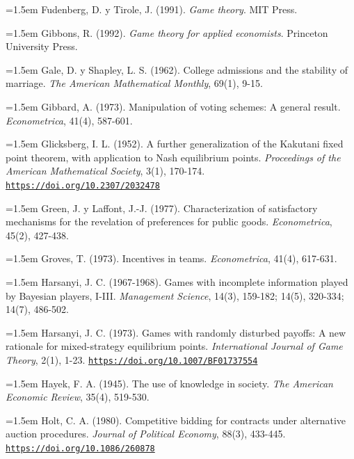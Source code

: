 \documentclass[10pt,a4paper]{article}
\begin{document}
\noindent\hangindent=1.5em Fudenberg, D. y Tirole, J. (1991). \textit{Game theory}. MIT Press.

\noindent\hangindent=1.5em Gibbons, R. (1992). \textit{Game theory for applied economists}. Princeton University Press.

\noindent\hangindent=1.5em Gale, D. y Shapley, L. S. (1962). College admissions and the stability of marriage. \textit{The American Mathematical Monthly}, 69(1), 9-15.

\noindent\hangindent=1.5em Gibbard, A. (1973). Manipulation of voting schemes: A general result. \textit{Econometrica}, 41(4), 587-601.

\noindent\hangindent=1.5em Glicksberg, I. L. (1952). A further generalization of the Kakutani fixed point theorem, with application to Nash equilibrium points. \textit{Proceedings of the American Mathematical Society}, 3(1), 170-174. \href{https://doi.org/10.2307/2032478}{\nolinkurl{https://doi.org/10.2307/2032478}}

\noindent\hangindent=1.5em Green, J. y Laffont, J.-J. (1977). Characterization of satisfactory mechanisms for the revelation of preferences for public goods. \textit{Econometrica}, 45(2), 427-438.

\noindent\hangindent=1.5em Groves, T. (1973). Incentives in teams. \textit{Econometrica}, 41(4), 617-631.

\noindent\hangindent=1.5em Harsanyi, J. C. (1967-1968). Games with incomplete information played by Bayesian players, I-III. \textit{Management Science}, 14(3), 159-182; 14(5), 320-334; 14(7), 486-502.

\noindent\hangindent=1.5em Harsanyi, J. C. (1973). Games with randomly disturbed payoffs: A new rationale for mixed-strategy equilibrium points. \textit{International Journal of Game Theory}, 2(1), 1-23. \href{https://doi.org/10.1007/BF01737554}{\nolinkurl{https://doi.org/10.1007/BF01737554}}

\noindent\hangindent=1.5em Hayek, F. A. (1945). The use of knowledge in society. \textit{The American Economic Review}, 35(4), 519-530.

\noindent\hangindent=1.5em Holt, C. A. (1980). Competitive bidding for contracts under alternative auction procedures. \textit{Journal of Political Economy}, 88(3), 433-445. \href{https://doi.org/10.1086/260878}{\nolinkurl{https://doi.org/10.1086/260878}}
\end{document}
